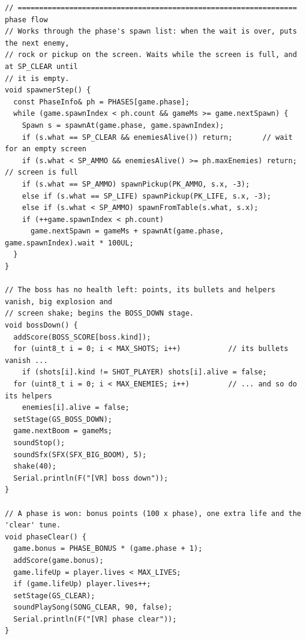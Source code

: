 \documentclass[11pt,a4paper]{article}
\begin{document}
\begin{latin}
\begin{lstlisting}[language=Arduino]
// ================================================================= phase flow
// Works through the phase's spawn list: when the wait is over, puts the next enemy,
// rock or pickup on the screen. Waits while the screen is full, and at SP_CLEAR until
// it is empty.
void spawnerStep() {
  const PhaseInfo& ph = PHASES[game.phase];
  while (game.spawnIndex < ph.count && gameMs >= game.nextSpawn) {
    Spawn s = spawnAt(game.phase, game.spawnIndex);
    if (s.what == SP_CLEAR && enemiesAlive()) return;       // wait for an empty screen
    if (s.what < SP_AMMO && enemiesAlive() >= ph.maxEnemies) return;   // screen is full
    if (s.what == SP_AMMO) spawnPickup(PK_AMMO, s.x, -3);
    else if (s.what == SP_LIFE) spawnPickup(PK_LIFE, s.x, -3);
    else if (s.what < SP_AMMO) spawnFromTable(s.what, s.x);
    if (++game.spawnIndex < ph.count)
      game.nextSpawn = gameMs + spawnAt(game.phase, game.spawnIndex).wait * 100UL;
  }
}

// The boss has no health left: points, its bullets and helpers vanish, big explosion and
// screen shake; begins the BOSS_DOWN stage.
void bossDown() {
  addScore(BOSS_SCORE[boss.kind]);
  for (uint8_t i = 0; i < MAX_SHOTS; i++)           // its bullets vanish ...
    if (shots[i].kind != SHOT_PLAYER) shots[i].alive = false;
  for (uint8_t i = 0; i < MAX_ENEMIES; i++)         // ... and so do its helpers
    enemies[i].alive = false;
  setStage(GS_BOSS_DOWN);
  game.nextBoom = gameMs;
  soundStop();
  soundSfx(SFX(SFX_BIG_BOOM), 5);
  shake(40);
  Serial.println(F("[VR] boss down"));
}

// A phase is won: bonus points (100 x phase), one extra life and the 'clear' tune.
void phaseClear() {
  game.bonus = PHASE_BONUS * (game.phase + 1);
  addScore(game.bonus);
  game.lifeUp = player.lives < MAX_LIVES;
  if (game.lifeUp) player.lives++;
  setStage(GS_CLEAR);
  soundPlaySong(SONG_CLEAR, 90, false);
  Serial.println(F("[VR] phase clear"));
}


\end{lstlisting}
\end{latin}
\end{document}
